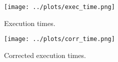 \documentclass[a4paper,11pt]{article}
\begin{document}
\begin{figure}[!h]
  \caption{Execution times.}
  \label{exec}
  \texttt{[image: ../plots/exec\_time.png]}
\end{figure}

\begin{figure}[!h]
  \caption{Corrected execution times.}
  \label{corr}
  \texttt{[image: ../plots/corr\_time.png]}
\end{figure}

\clearpage

\begin{comment}
\paragraph\noindent\textbf{Overview of the linear program}
\begin{itemize}
\renewcommand{\labelitemi}{$\bullet$}
\item Load image from disk
\item Calculate average RGB sum
\item Calculate output image
\item Write image to disk
\end{itemize}

\begin{figure}[!h]
  \caption{Run times related to number of cores for the different images.}
  \label{runtime_vs_cores}
  \texttt{[image: ../plots/runtimevscoresthres.png]}
\end{figure}

\begin{table}[h!]
  \caption{$MPixels/Second$ when running with different amount of threads and on different data.}
  \label{mpixelspersecond}
  \begin{tabular}[h]{|l|l|l|l|l|l|}
    \hline
                      & 1      & 2      & 4      & 8      & 16\\
    \hline
    im1.ppm           & 135.41 & 183.31 & 184.94 & 68.89  & 21.77\\ 
    im2.ppm           & 150.01 & 209.17 & 274.71 & 201.65 & 63.15\\ 
    im3.ppm           & 146.25 & 209.72 & 274.44 & 275.62 & 138.23\\ 
    im4.ppm           & 145.07 & 212.56 & 286.41 & 332.90 & 297.42\\
    \hline
  \end{tabular}
\end{table}


\end{comment}
\end{document}
